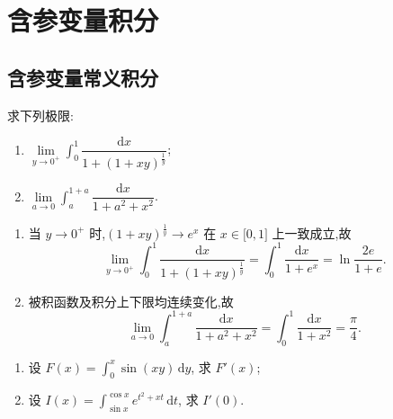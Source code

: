 \setcounter{chapter}{10}
\pagestyle{fancy}

\chapter{含参变量积分}


\section{含参变量常义积分}

\begin{example}
    求下列极限:
    \begin{enumerate}
        \item $\displaystyle \lim\limits_{y\to0^+}\int_0^1\dfrac{\mathrm{d}x}{1+(1+xy)^{\frac{1}{y}}}$;
        \item $\displaystyle \lim\limits_{a\to0}\int_a^{1+a}\dfrac{\mathrm{d}x}{1+a^2+x^2}$.
    \end{enumerate}
\end{example}
\exampleblank

\begin{solution}
    \begin{enumerate}
        \item 当 $y\to0^+$ 时,$(1+xy)^{\frac{1}{y}}\to e^x$ 在 $x\in\lbrack0,1\rbrack$ 上一致成立,故
              \[
                  \lim\limits_{y\to0^+}\int_0^1\dfrac{\mathrm{d}x}{1+(1+xy)^{\frac{1}{y}}}
                  =\int_0^1\dfrac{\mathrm{d}x}{1+e^x}
                  =\ln\dfrac{2e}{1+e}.
              \]
        \item 被积函数及积分上下限均连续变化,故
              \[
                  \lim\limits_{a\to0}\int_a^{1+a}\dfrac{\mathrm{d}x}{1+a^2+x^2}
                  =\int_0^1\dfrac{\mathrm{d}x}{1+x^2}=\dfrac{\pi}{4}.
              \]
    \end{enumerate}
\end{solution}

\begin{example}
    \begin{enumerate}
        \item 设 $F(x)=\displaystyle\int_0^x\sin(xy)\,\mathrm{d}y$, 求 $F'(x)$;
        \item 设 $I(x)=\displaystyle\int_{\sin x}^{\cos x}e^{t^2+xt}\,\mathrm{d}t$, 求 $I'(0)$.
    \end{enumerate}
\end{example}
\exampleblank

